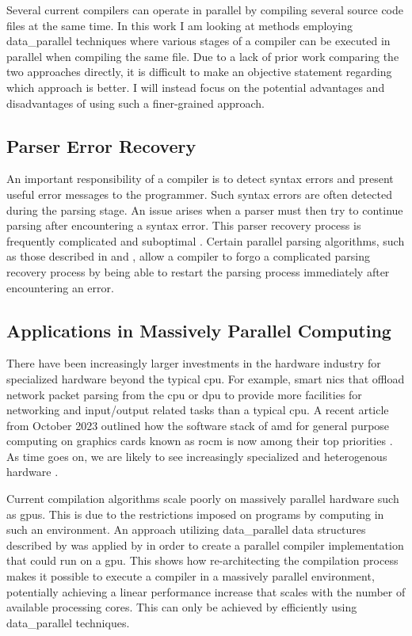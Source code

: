 Several current compilers can operate in parallel by compiling several source
code files at the same time. In this work I am looking at methods employing
\gls{data_parallel} techniques where various stages of a compiler can be executed in
parallel when compiling the same file. Due to a lack of prior work comparing
the two approaches directly, it is difficult to make an objective statement
regarding which approach is better. I will instead focus on the potential
advantages and disadvantages of using such a finer-grained approach.

\subsection{Parser Error Recovery}

An important responsibility of a compiler is to detect syntax errors and
present useful error messages to the programmer. Such syntax errors are often
detected during the parsing stage. An issue arises when a parser must then try
to continue parsing after encountering a syntax error. This parser recovery
process is frequently complicated and suboptimal \citep{medeiros_syntax_2018,
hutchison_pika_2020}. Certain parallel parsing algorithms, such as those
described in \citet{clarke_error_1993} and \cite{barenghi_parallel_2015}, allow
a compiler to forgo a complicated parsing recovery process by being able to
restart the parsing process immediately after encountering an error.

\subsection{Applications in Massively Parallel Computing}

There have been increasingly larger investments in the hardware industry for
specialized hardware beyond the typical \gls{cpu}.  For example, smart \glspl{nic}
 that offload network packet parsing from the \gls{cpu} or \gls{dpu} to provide
more facilities for networking and input/output related tasks than a typical
\gls{cpu}. A recent article from October 2023 outlined how the software stack
of \gls{amd} for general purpose computing on graphics cards known as \gls{rocm}
is now among their top priorities \citep{ward-foxton_rocm_2023}. As time goes
on, we are likely to see increasingly specialized and heterogenous hardware
\citep{stefan_lets_2021}.

Current compilation algorithms scale poorly on massively parallel hardware
such as \glspl{gpu}. This is due to the restrictions imposed on programs by
computing in such an environment. An approach utilizing \gls{data_parallel}
data structures described by \cite{hillis_data_1986} was applied by
\cite{voetter_compilation_2022} in order to create a parallel compiler
implementation that could run on a \gls{gpu}. This shows how  re-architecting
the compilation process makes it possible to execute a compiler in a massively
parallel environment, potentially achieving a linear performance increase that
scales with the number of available processing cores. This can only be achieved
by efficiently using \gls{data_parallel} techniques.

